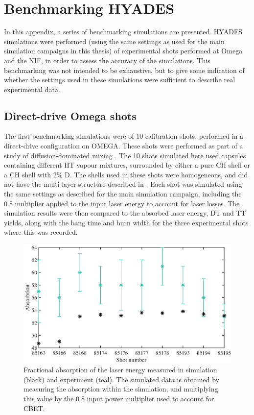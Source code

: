 \chapter{Benchmarking HYADES} \label{app:benchmark}

\minitoc

In this appendix, a series of benchmarking simulations are presented. HYADES simulations were performed (using the same settings as used for the main simulation campaigns in this thesis) of experimental shots performed at Omega and the NIF, in order to assess the accuracy of the simulations. This benchmarking was not intended to be exhaustive, but to give some indication of whether the settings used in these simulations were sufficient to describe real experimental data.

\section{Direct-drive Omega shots}

The first benchmarking simulations were of 10 calibration shots, performed in a direct-drive configuration on OMEGA. These shots were performed as part of a study of diffusion-dominated mixing \cite{Zylstra2018a}. The 10 shots simulated here used capsules containing different HT vapour mixtures, surrounded by either a pure CH shell or a CH shell with 2\% D. The shells used in these shots were homogeneous, and did not have the multi-layer structure described in \cite{Zylstra2018a}. Each shot was simulated using the same settings as described for the main simulation campaign, including the 0.8 multiplier applied to the input laser energy to account for laser losses. The simulation results were then compared to the absorbed laser energy, DT and TT yields, along with the bang time and burn width for the three experimental shots where this was recorded.

\begin{figure}[ht]
\centering
\includegraphics{figures/LowCR/BenchmarkOmegaAbsorbtion.eps}
\caption{Fractional absorption of the laser energy measured in simulation (black) and experiment (teal). The simulated data is obtained by measuring the absorption within the simulation, and multiplying this value by the 0.8 input power multiplier used to account for CBET.}
\label{fig:OmegaAbs}
\end{figure}

